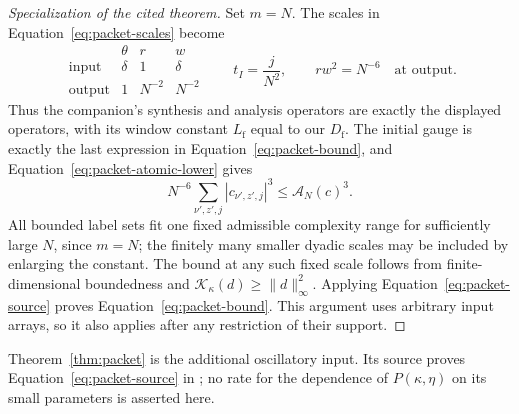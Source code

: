\begin{proof}[Specialization of the cited theorem]
Set $m=N$.  The scales in Equation~\eqref{eq:packet-scales} become
\[
\begin{array}{c|ccc}
 &\theta&r&w\\ \hline
 \text{input}&\delta&1&\delta\\
 \text{output}&1&N^{-2}&N^{-2}
\end{array}
\qquad t_I=\frac{j}{N^2},\qquad rw^2=N^{-6}\quad\text{at output}.
\]
Thus the companion's synthesis and
analysis operators are exactly the displayed operators, with
its window constant $L_{\mathrm f}$ equal to our $D_{\mathrm f}$.
The initial gauge is exactly the last expression in
Equation~\eqref{eq:packet-bound}, and
Equation~\eqref{eq:packet-atomic-lower} gives
\[
 N^{-6}\sum_{\nu',z',j}|c_{\nu',z',j}|^3
      \le\mathcal A_N(c)^3.
\]
All bounded label sets fit one fixed admissible complexity range
for sufficiently large $N$, since $m=N$; the finitely many
smaller dyadic scales may be included by enlarging the constant.
The bound at any such fixed scale follows from finite-dimensional
boundedness and $\mathcal K_\kappa(d)\ge\|d\|_\infty^2$.
Applying Equation~\eqref{eq:packet-source} proves
Equation~\eqref{eq:packet-bound}.  This argument uses arbitrary
input arrays, so it also applies after any restriction of their
support.
\end{proof}

Theorem~\ref{thm:packet} is the additional oscillatory input.  Its
source proves Equation~\eqref{eq:packet-source} in
\cite[Section~\PacketProofSection]{OpenAIPacket2026}; no rate for the dependence
of $P(\kappa,\eta)$ on its small parameters is asserted here.
